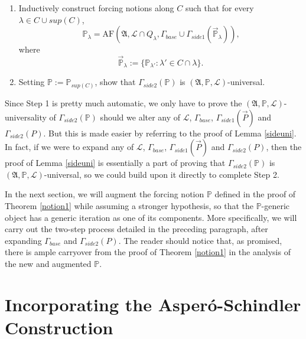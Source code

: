 \documentclass[12pt, twoside]{memoir}
\numberwithin{equation}{section}
\theoremstyle{definition}
\theoremstyle{remark}
\theoremstyle{definition}
\theoremstyle{definition}
\theoremstyle{definition}
\theoremstyle{remark}
\begin{document}
\begin{enumerate}[leftmargin=50pt, label=Step \arabic*:]
    \item\label{remstep1} Inductively construct forcing notions along $C$ such that for every $\lambda \in C \cup sup(C)$, $$\mathbb{P}_{\lambda} = \mathrm{AF}(\mathfrak{A}, \mathcal{L} \cap Q_{\lambda}, \Gamma_{base} \cup \Gamma_{side1}(\Vec{\mathbb{P}}_{\lambda})) \text{,}$$ where $$\Vec{\mathbb{P}}_{\lambda} := \{\mathbb{P}_{\lambda'} : \lambda' \in C \cap \lambda\} \text{.}$$
    \item Setting $\mathbb{P} := \mathbb{P}_{sup(C)}$, show that $\Gamma_{side2}(\mathbb{P})$ is $(\mathfrak{A}, \mathbb{P}, \mathcal{L})$-universal.
\end{enumerate}
Since Step 1 is pretty much automatic, we only have to prove the $(\mathfrak{A}, \mathbb{P}, \mathcal{L})$-universality of $\Gamma_{side2}(\mathbb{P})$ should we alter any of $\mathcal{L}$, $\Gamma_{base}$, $\Gamma_{side1}(\Vec{P})$ and $\Gamma_{side2}(P)$. But this is made easier by referring to the proof of Lemma \ref{sideuni}. In fact, if we were to expand any of $\mathcal{L}$, $\Gamma_{base}$, $\Gamma_{side1}(\Vec{P})$ and $\Gamma_{side2}(P)$, then the proof of Lemma \ref{sideuni} is essentially a part of proving that $\Gamma_{side2}(\mathbb{P})$ is $(\mathfrak{A}, \mathbb{P}, \mathcal{L})$-universal, so we could build upon it directly to complete Step 2. 

In the next section, we will augment the forcing notion $\mathbb{P}$ defined in the proof of Theorem \ref{notion1} while assuming a stronger hypothesis, so that the $\mathbb{P}$-generic object has a generic iteration as one of its components. More specifically, we will carry out the two-step process detailed in the preceding paragraph, after expanding $\Gamma_{base}$ and $\Gamma_{side2}(P)$. The reader should notice that, as promised, there is ample carryover from the proof of Theorem \ref{notion1} in the analysis of the new and augmented $\mathbb{P}$.

\section{Incorporating the Asper\'{o}-Schindler Construction}\label{ss43}
\end{document}
